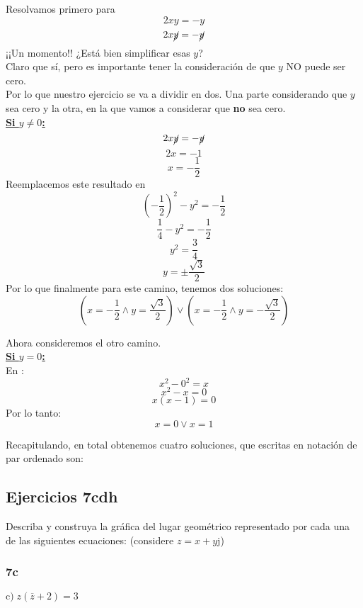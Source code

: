 \documentclass[11pt]{article}
\def\imj{\mathrm{j}}
\newcommand*\circled[1]{\tikz[baseline=(char.base)]{
		\node[shape=circle,draw,inner sep=2pt] (char) {#1};}}
\begin{document}
		\begin{center}
			Resolvamos primero para \circled{2}
			$$2xy=-y$$
			$$2x\cancel{y}=-\cancel{y}$$
			¡¡Un momento!! ¿Está bien simplificar esas $y$? \\
			Claro que sí, pero es importante tener la consideración de que $y$ NO puede ser cero.\\
			Por lo que nuestro ejercicio se va a dividir en dos. Una parte considerando que $y$ sea cero y la otra, en la que vamos a considerar que \textbf{no} sea cero. \\
			\vspace{0.35cm}
			\underline{\textbf{Si $y\neq0$:}}
			$$2x\cancel{y}=-\cancel{y}$$
			$$2x=-1$$
			$$\boxed{x=-\frac{1}{2}}$$
			Reemplacemos este resultado en \circled{1}
			$${\left(-\frac{1}{2}\right)}^{2}-y^{2}=-\frac{1}{2}$$
			$$\frac{1}{4}-y^{2}=-\frac{1}{2}$$
			$$y^{2}=\frac{3}{4}$$
			$$\boxed{y=\pm\frac{\sqrt{3}}{2}}$$
			Por lo que finalmente para este camino, tenemos dos soluciones:
			$$\boxed{\left( x=-\frac{1}{2} \wedge y=\frac{\sqrt{3}}{2}\right)  \vee \left( x=-\frac{1}{2}\wedge y=-\frac{\sqrt{3}}{2}\right)}$$
			
			Ahora consideremos el otro camino. \\
			\textbf{\underline{Si $y=0$:}} \\
			En \circled{1}:
			$$x^2-0^2=x$$
			$$x^2-x=0$$
			$$x(x-1)=0$$
			Por lo tanto:
			$$\boxed{x=0 \vee x=1}$$
			
			Recapitulando, en total obtenemos cuatro soluciones, que escritas en notación de par ordenado son:
			\begin{center}
			\end{center}
		\end{center}		
	\subsection{Ejercicios 7cdh}
	Describa y construya la gráfica del lugar geométrico representado por cada una de las siguientes ecuaciones: (considere $z=x+y\imj$)
	\subsubsection{7c}
	$\mathrm{c)}\;z\left(\overline{z}+2\right)=3$
	
\end{document}
